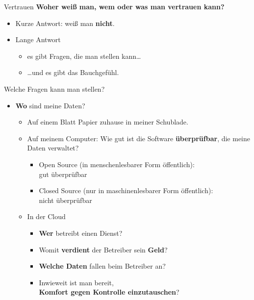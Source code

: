   \begin{frame}{Vertrauen}
    \textbf{Woher weiß man, wem oder was man vertrauen kann?}
    \begin{itemize}
      \item Kurze Antwort: weiß man \textbf{nicht}.
      \item Lange Antwort
      \begin{itemize}
        \item es gibt Fragen, die man stellen kann\ldots
        \item {\ldots}und es gibt das Bauchgefühl.
      \end{itemize}
    \end{itemize}
  \end{frame}
\begin{frame}{Welche Fragen kann man stellen?}
  \begin{itemize}
    \item \textbf{Wo} sind meine Daten?
    \begin{itemize}
      \item Auf einem Blatt Papier zuhause in meiner Schublade.
      \item Auf meinem Computer: Wie gut ist die Software \textbf{überprüfbar}, die meine Daten verwaltet?
        \begin{itemize}
          \item Open Source (in menschenlesbarer Form öffentlich):\\gut überprüfbar
          \item Closed Source (nur in maschinenlesbarer Form öffentlich):\\nicht überprüfbar
        \end{itemize}
      \item In der Cloud
        \begin{itemize}
          \item \textbf{Wer} betreibt einen Dienst?
          \item Womit \textbf{verdient} der Betreiber sein \textbf{Geld}?
          \item \textbf{Welche Daten} fallen beim Betreiber an?
          \item Inwieweit ist man bereit,\\ \textbf{Komfort gegen Kontrolle einzutauschen}?
        \end{itemize}
    \end{itemize}
  \end{itemize}
\end{frame}


